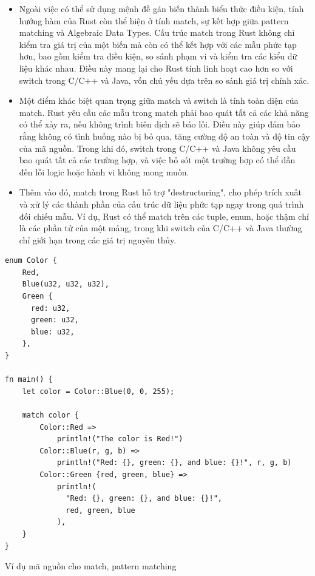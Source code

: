 \begin{itemize}
    \item Ngoài việc có thể sử dụng mệnh đề gán biến thành biểu thức điều kiện, tính hướng hàm của Rust còn thể hiện ở tính match, sự kết hợp giữa pattern matching và Algebraic Data Types. Cấu trúc match trong Rust không chỉ kiểm tra giá trị của một biến mà còn có thể kết hợp với các mẫu phức tạp hơn, bao gồm kiểm tra điều kiện, so sánh phạm vi và kiểm tra các kiểu dữ liệu khác nhau. Điều này mang lại cho Rust tính linh hoạt cao hơn so với switch trong C/C++ và Java, vốn chủ yếu dựa trên so sánh giá trị chính xác.
    \item Một điểm khác biệt quan trọng giữa match và switch là tính toàn diện của match. Rust yêu cầu các mẫu trong match phải bao quát tất cả các khả năng có thể xảy ra, nếu không trình biên dịch sẽ báo lỗi. Điều này giúp đảm bảo rằng không có tình huống nào bị bỏ qua, tăng cường độ an toàn và độ tin cậy của mã nguồn. Trong khi đó, switch trong C/C++ và Java không yêu cầu bao quát tất cả các trường hợp, và việc bỏ sót một trường hợp có thể dẫn đến lỗi logic hoặc hành vi không mong muốn.
    \item Thêm vào đó, match trong Rust hỗ trợ "destructuring", cho phép trích xuất và xử lý các thành phần của cấu trúc dữ liệu phức tạp ngay trong quá trình đối chiếu mẫu. Ví dụ, Rust có thể match trên các tuple, enum, hoặc thậm chí là các phần tử của một mảng, trong khi switch của C/C++ và Java thường chỉ giới hạn trong các giá trị nguyên thủy.
\end{itemize}

\begin{listing}[H]
\begin{verbatim}
enum Color {
    Red,
    Blue(u32, u32, u32),
    Green {
      red: u32,
      green: u32,
      blue: u32,
    },
}

fn main() {
    let color = Color::Blue(0, 0, 255);

    match color {
        Color::Red =>
            println!("The color is Red!")
        Color::Blue(r, g, b) =>
            println!("Red: {}, green: {}, and blue: {}!", r, g, b)
        Color::Green {red, green, blue} =>
            println!(
              "Red: {}, green: {}, and blue: {}!",
              red, green, blue
            ),
    }
}
\end{verbatim}
\caption{Ví dụ mã nguồn cho match, pattern matching}
\label{code:c3_letelse}
\end{listing}

